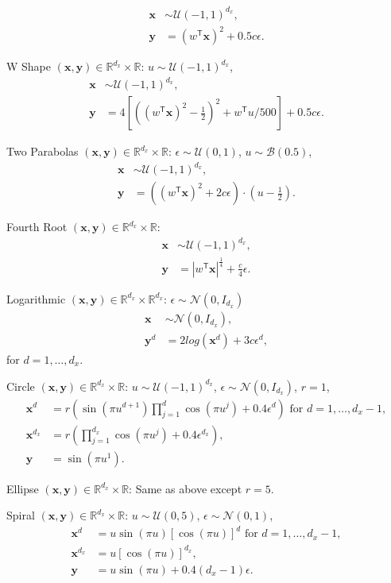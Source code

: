 \documentclass[11pt]{article}
\providecommand{\mb}[1]{\boldsymbol{#1}}
\providecommand{\mc}[1]{\mathcal{#1}}
\newcommand{\Real}{\mathbb{R}}
\newcommand{\T}{^{\ensuremath{\mathsf{T}}}}           %
\newcommand{\mbx}{\ensuremath{\mb{x}}}
\newcommand{\mby}{\ensuremath{\mb{y}}}
\begin{document}
\begin{compactenum}
\begin{align*}
\mbx &\sim \mc{U}(-1,1)^{d_{x}},\\
\mby&=(w\T \mbx)^2+0.5c\epsilon.
\end{align*}
\item W Shape $(\mbx,\mby) \in \Real^{d_{x}} \times \Real$:  $u \sim \mc{U}(-1,1)^{d_{x}}$,
\begin{align*}
\mbx &\sim \mc{U}(-1,1)^{d_{x}},\\
\mby&=4\left[ \left( (w\T \mbx)^2 - \tfrac{1}{2} \right)^2 + w\T u/500 \right]+0.5c\epsilon.
\end{align*}
\item Two Parabolas $(\mbx,\mby) \in \Real^{d_{x}} \times \Real$: $\epsilon \sim \mc{U}(0,1)$, $u \sim \mc{B}(0.5)$,
\begin{align*}
\mbx &\sim \mc{U}(-1,1)^{d_{x}},\\
\mby&=\left( (w\T \mbx)^2  + 2c\epsilon\right) \cdot (u-\tfrac{1}{2}).
\end{align*}
\item Fourth Root $(\mbx,\mby) \in \Real^{d_{x}} \times \Real$:
\begin{align*}
\mbx &\sim \mc{U}(-1,1)^{d_{x}},\\
\mby&=|w\T \mbx|^\frac{1}{4}+\frac{c}{4}\epsilon.
\end{align*}
\item Logarithmic $(\mbx,\mby) \in \Real^{d_{x}} \times \Real^{d_{x}}$: $\epsilon \sim \mc{N}(0, I_{d_{x}})$
\begin{align*}
\mbx &\sim \mc{N}(0, I_{d_{x}}),\\
\mby^{d}&=2log(\mbx^{d})+3c\epsilon^{d},
\end{align*}
for $d=1,\ldots,d_{x}$.
\item Circle $(\mbx,\mby) \in \Real^{d_{x}} \times \Real$: $u \sim \mc{U}(-1,1)^{d_{x}}$, $\epsilon \sim \mc{N}(0, I_{d_{x}})$, $r=1$,
\begin{align*}
\mbx^{d}&=r \left(\sin(\pi u^{d+1})  \prod_{j=1}^{d} \cos(\pi u^{j})+0.4 \epsilon^{d}\right) \mbox{ for $d=1,\ldots,d_{x}-1$},\\
\mbx^{d_{x}}&=r \left(\prod_{j=1}^{d_{x}} \cos(\pi u^{j})+0.4 \epsilon^{d_{x}}\right),\\
\mby&= \sin(\pi u^{1}).
\end{align*}
\item Ellipse $(\mbx,\mby) \in \Real^{d_{x}} \times \Real$: Same as above except $r=5$.

\item Spiral $(\mbx,\mby) \in \Real^{d_{x}} \times \Real$: $u \sim \mc{U}(0,5)$, $\epsilon \sim \mc{N}(0, 1)$,
\begin{align*}
\mbx^{d}&=u \sin(\pi u)  [\cos(\pi u)]^{d} \mbox{ for $d=1,\ldots,d_{x}-1$},\\
\mbx^{d_{x}}&=u [\cos(\pi u)]^{d_{x}},\\
\mby&= u \sin(\pi u) +0.4 (d_{x}-1)\epsilon.
\end{align*}


\end{compactenum}
\end{document}
